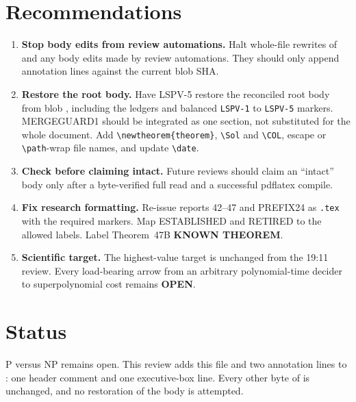 \documentclass[11pt]{article}
\newcommand{\OPEN}{\textbf{OPEN}}
\newcommand{\KNOWN}{\textbf{KNOWN THEOREM}}
\begin{document}
\section{Recommendations}
\begin{enumerate}
\item \textbf{Stop body edits from review automations.} Halt whole-file
rewrites of  and any body edits made by review
automations. They should only append annotation lines against the
current blob SHA.
\item \textbf{Restore the root body.} Have LSPV-5 restore the reconciled
root body from blob , including the ledgers and balanced
\texttt{LSPV-1} to \texttt{LSPV-5} markers. MERGEGUARD1 should be
integrated as one section, not substituted for the whole document. Add
\verb|\newtheorem{theorem}|, \verb|\Sol| and \verb|\COL|, escape or
\verb|\path|-wrap file names, and update \verb|\date|.
\item \textbf{Check before claiming intact.} Future reviews should claim
an ``intact'' body only after a byte-verified full read and a successful
pdflatex compile.
\item \textbf{Fix research formatting.} Re-issue reports 42--47 and
PREFIX24 as \texttt{.tex} with the required markers. Map ESTABLISHED and
RETIRED to the allowed labels. Label Theorem~47B \KNOWN{}.
\item \textbf{Scientific target.} The highest-value target is unchanged
from the 19:11 review. Every load-bearing arrow from an arbitrary
polynomial-time decider to superpolynomial cost remains \OPEN{}.
\end{enumerate}

\section{Status}
P versus NP remains open. This review adds this file and two annotation
lines to : one header comment and one executive-box line.
Every other byte of  is unchanged, and no restoration of
the body is attempted.

\end{document}
